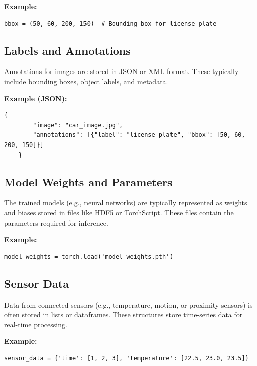 \textbf{Example:}
\begin{lstlisting}[style=python]
	bbox = (50, 60, 200, 150)  # Bounding box for license plate
\end{lstlisting}

\subsection*{Labels and Annotations}
Annotations for images are stored in JSON or XML format. These typically include bounding boxes, object labels, and metadata.

\textbf{Example (JSON):}
\begin{lstlisting}[style=json]
	{
		"image": "car_image.jpg",
		"annotations": [{"label": "license_plate", "bbox": [50, 60, 200, 150]}]
	}
\end{lstlisting}

\subsection*{Model Weights and Parameters}
The trained models (e.g., neural networks) are typically represented as weights and biases stored in files like HDF5 or TorchScript. These files contain the parameters required for inference.

\textbf{Example:}
\begin{lstlisting}[style=python]
	model_weights = torch.load('model_weights.pth')
\end{lstlisting}

\subsection*{Sensor Data}
Data from connected sensors (e.g., temperature, motion, or proximity sensors) is often stored in lists or dataframes. These structures store time-series data for real-time processing. \cite{PTD:2018}

\textbf{Example:}
\begin{lstlisting}[style=python]
	sensor_data = {'time': [1, 2, 3], 'temperature': [22.5, 23.0, 23.5]}
\end{lstlisting}

